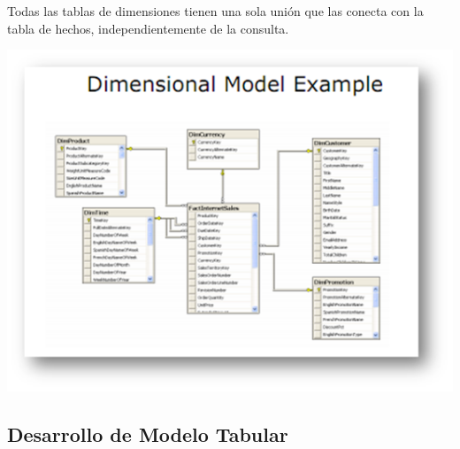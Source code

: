 \documentclass[preprint,12pt]{elsarticle}
\begin{document}
Todas las tablas de dimensiones tienen una sola unión que las conecta con la tabla de hechos, independientemente de la consulta.\\
\begin{center}
	\includegraphics[width=14cm]{./Imagenes/jho2} 
\end{center}

\subsection{Desarrollo de Modelo Tabular}
\end{document}
